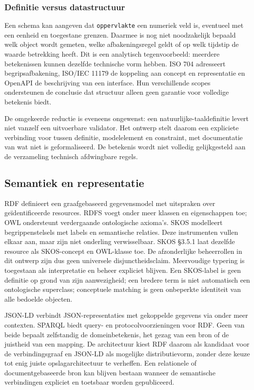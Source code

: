 \subsubsection{Definitie versus datastructuur}
Een schema kan aangeven dat \texttt{oppervlakte} een numeriek veld is, eventueel met een eenheid en toegestane grenzen. Daarmee is nog niet noodzakelijk bepaald welk object wordt gemeten, welke afbakeningsregel geldt of op welk tijdstip de waarde betrekking heeft. Dit is een analytisch tegenvoorbeeld: meerdere betekenissen kunnen dezelfde technische vorm hebben. ISO 704 adresseert begripsafbakening, ISO/IEC 11179 de koppeling aan concept en representatie en OpenAPI de beschrijving van een interface. \citep{S11,S08,S19} Hun verschillende scopes ondersteunen de conclusie dat structuur alleen geen garantie voor volledige betekenis biedt.

De omgekeerde reductie is eveneens ongewenst: een natuurlijke-taaldefinitie levert niet vanzelf een uitvoerbare validator. Het ontwerp stelt daarom een expliciete verbinding voor tussen definitie, modelelement en constraint, met documentatie van wat niet is geformaliseerd. De betekenis wordt niet volledig gelijkgesteld aan de verzameling technisch afdwingbare regels.

\subsection{Semantiek en representatie}
RDF definieert een graafgebaseerd gegevensmodel met uitspraken over geïdentificeerde resources. RDFS voegt onder meer klassen en eigenschappen toe; OWL ondersteunt verdergaande ontologische axioma’s. SKOS modelleert begrippenstelsels met labels en semantische relaties. \citep{S28,S29,S30,S31} Deze instrumenten vullen elkaar aan, maar zijn niet onderling verwisselbaar. SKOS §3.5.1 laat dezelfde resource als SKOS-concept en OWL-klasse toe. De afzonderlijke beheerrollen in dit ontwerp zijn dus geen universele disjunctheidsclaim. Meervoudige typering is toegestaan als interpretatie en beheer expliciet blijven. \citep{S31} Een SKOS-label is geen definitie op grond van zijn aanwezigheid; een bredere term is niet automatisch een ontologische superclass; conceptuele matching is geen onbeperkte identiteit van alle bedoelde objecten. \citep{S31,S30}

JSON-LD verbindt JSON-representaties met gekoppelde gegevens via onder meer contexten. SPARQL biedt query- en protocolvoorzieningen voor RDF. Geen van beide bepaalt zelfstandig de domeinbetekenis, het gezag van een bron of de juistheid van een mapping. \citep{S35,S36} De architectuur kiest RDF daarom als kandidaat voor de verbindingsgraaf en JSON-LD als mogelijke distributievorm, zonder deze keuze tot enig juiste opslagarchitectuur te verheffen. Een relationele of documentgebaseerde bron kan blijven bestaan wanneer de semantische verbindingen expliciet en toetsbaar worden gepubliceerd.

